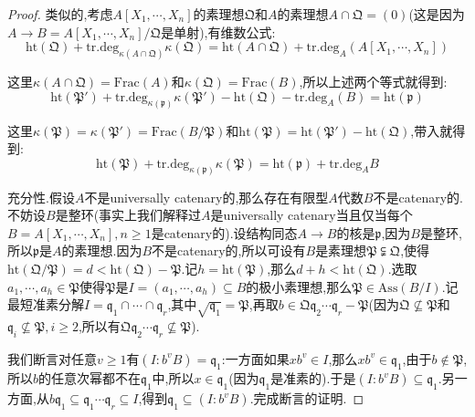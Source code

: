 \begin{enumerate}
\begin{proof}
		类似的,考虑$A[X_1,\cdots,X_n]$的素理想$\mathfrak{Q}$和$A$的素理想$A\cap\mathfrak{Q}=(0)$(这是因为$A\to B=A[X_1,\cdots,X_n]/\mathfrak{Q}$是单射),有维数公式:
		$$\mathrm{ht}(\mathfrak{Q})+\mathrm{tr.deg}_{\kappa(A\cap\mathfrak{Q})}\kappa(\mathfrak{Q})=\mathrm{ht}(A\cap\mathfrak{Q})+\mathrm{tr.deg}_A(A[X_1,\cdots,X_n])$$
		
		这里$\kappa(A\cap\mathfrak{Q})=\mathrm{Frac}(A)$和$\kappa(\mathfrak{Q})=\mathrm{Frac}(B)$,所以上述两个等式就得到:
		$$\mathrm{ht}(\mathfrak{P}')+\mathrm{tr.deg}_{\kappa(\mathfrak{p})}\kappa(\mathfrak{P}')-\mathrm{ht}(\mathfrak{Q})-\mathrm{tr.deg}_A(B)=\mathrm{ht}(\mathfrak{p})$$
		
		这里$\kappa(\mathfrak{P})=\kappa(\mathfrak{P}')=\mathrm{Frac}(B/\mathfrak{P})$和$\mathrm{ht}(\mathfrak{P})=\mathrm{ht}(\mathfrak{P}')-\mathrm{ht}(\mathfrak{Q})$,带入就得到:
		$$\mathrm{ht}(\mathfrak{P})+\mathrm{tr.deg}_{\kappa(\mathfrak{p})}\kappa(\mathfrak{P})=\mathrm{ht}(\mathfrak{p})+\mathrm{tr.deg}_AB$$
		
		充分性.假设$A$不是universally catenary的,那么存在有限型$A$代数$B$不是catenary的.不妨设$B$是整环(事实上我们解释过$A$是universally catenary当且仅当每个$B=A[X_1,\cdots,X_n],n\ge1$是catenary的).设结构同态$A\to B$的核是$\mathfrak{p}$,因为$B$是整环,所以$\mathfrak{p}$是$A$的素理想.因为$B$不是catenary的,所以可设有$B$是素理想$\mathfrak{P}\subsetneqq\mathfrak{Q}$,使得$\mathrm{ht}(\mathfrak{Q}/\mathfrak{P})=d<\mathrm{ht}(\mathfrak{Q})-\mathrm{\mathfrak{P}}$.记$h=\mathrm{ht}(\mathfrak{P})$,那么$d+h<\mathrm{ht}(\mathfrak{Q})$.选取$a_1,\cdots,a_h\in\mathfrak{P}$使得$\mathfrak{P}$是$I=(a_1,\cdots,a_h)\subseteq B$的极小素理想,那么$\mathfrak{P}\in\mathrm{Ass}(B/I)$.记最短准素分解$I=\mathfrak{q}_1\cap\cdots\cap\mathfrak{q}_r$,其中$\sqrt{\mathfrak{q}_1}=\mathfrak{P}$,再取$b\in\mathfrak{Q}\mathfrak{q}_2\cdots\mathfrak{q}_r-\mathfrak{P}$(因为$\mathfrak{Q}\not\subseteq\mathfrak{P}$和$\mathfrak{q}_i\not\subseteq\mathfrak{P},i\ge2$,所以有$\mathfrak{Q}\mathfrak{q}_2\cdots\mathfrak{q}_r\not\subseteq\mathfrak{P}$).
		
		\qquad
		
		我们断言对任意$v\ge1$有$(I:b^vB)=\mathfrak{q}_1$:一方面如果$xb^v\in I$,那么$xb^v\in\mathfrak{q}_1$,由于$b\not\in\mathfrak{P}$,所以$b$的任意次幂都不在$\mathfrak{q}_1$中,所以$x\in\mathfrak{q}_1$(因为$\mathfrak{q}_1$是准素的).于是$(I:b^vB)\subseteq\mathfrak{q}_1$.另一方面,从$b\mathfrak{q}_1\subseteq\mathfrak{q}_1\cdots\mathfrak{q}_r\subseteq I$,得到$\mathfrak{q}_1\subseteq(I:b^vB)$.完成断言的证明.
		
		\qquad
		

\end{proof}
\end{enumerate}
